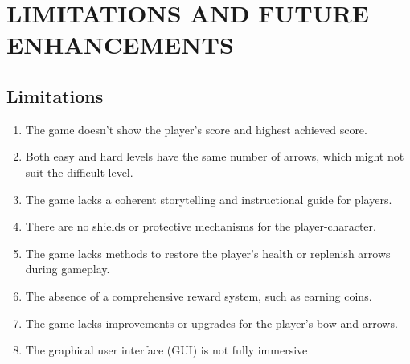 \section{LIMITATIONS AND FUTURE ENHANCEMENTS}

\subsection{Limitations}
\begin{enumerate}
	\item The game doesn't show the player's score and highest achieved score.
	\item Both easy and hard levels have the same number of arrows, which might not suit the difficult level.
	
	\item The game lacks a coherent storytelling and instructional guide for players.
	\item There are no shields or protective mechanisms for the player-character.
	\item The game lacks methods to restore the player's health or replenish arrows during gameplay.
	\item The absence of a comprehensive reward system, such as earning coins.
	\item The game lacks improvements or upgrades for the player's bow and arrows.
	\item The graphical user interface (GUI) is not fully immersive
\end{enumerate}



